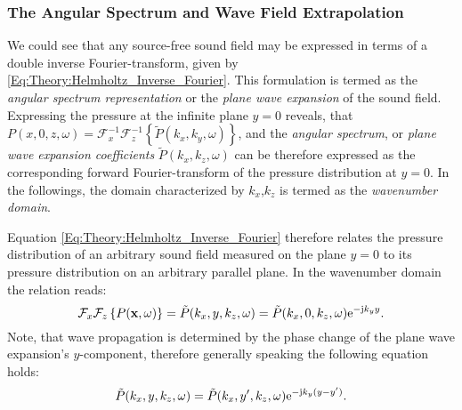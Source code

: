 \subsubsection{The Angular Spectrum and Wave Field Extrapolation}
We could see that any source-free sound field may be expressed in terms of a double inverse Fourier-transform, given by \eqref{Eq:Theory:Helmholtz_Inverse_Fourier}.
This formulation is termed as the \emph{angular spectrum representation} \cite{Ahrens2010phd, Ahrens2012, Williams1999} or the \emph{plane wave expansion} \cite{Spors2005} of the sound field.
Expressing the pressure at the infinite plane $y=0$ reveals, that $P(x,0,z,\omega) = \mathcal{F}_x^{-1}\mathcal{F}_z^{-1} \left\{\tilde{P}(k_x,k_y, \omega)\right\}$,
and the \emph{angular spectrum}, or \emph{plane wave expansion coefficients} $\tilde{P}(k_x,k_z, \omega)$ can be therefore expressed as the corresponding forward Fourier-transform of the pressure distribution at $y=0$.%
In the followings, the domain characterized by $k_x$,$k_z$ is termed as the \emph{wavenumber domain}.

Equation \eqref{Eq:Theory:Helmholtz_Inverse_Fourier} therefore relates the pressure distribution of an arbitrary sound field measured on the plane $y=0$ to its pressure distribution on an arbitrary parallel plane. In the wavenumber domain the relation reads:
\begin{equation}
\mathcal{F}_x\mathcal{F}_z \left\{ P(\mathbf{x},\omega) \right\} = \tilde{P}(k_x,y,k_z,\omega) = \tilde{P}(k_x,0,k_z,\omega) \mathrm{e}^{-\mathrm{j} k_y y}.
\label{Eq:Theory:Wave_field_extrapolation}
\end{equation}
Note, that wave propagation is determined by the phase change of the plane wave expansion's $y$-component, therefore generally speaking the following equation holds:
\begin{equation}
\tilde{P}(k_x,y,k_z,\omega) = \tilde{P}(k_x,y',k_z,\omega) \mathrm{e}^{-\mathrm{j} k_y ( y - y' ) }.
\end{equation}

